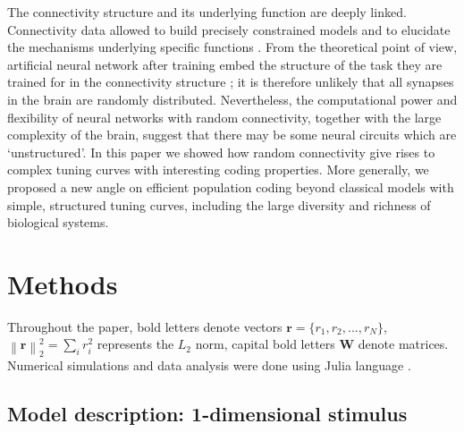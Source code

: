 \documentclass[a4paper]{article}
\begin{document}
The connectivity structure and its underlying function are deeply linked.  Connectivity data allowed  to build precisely constrained models \cite{Litwin-Kumar2019ConstrainingDiagrams} and to elucidate the mechanisms underlying specific functions \cite{Kim2014Space-timeRetina}. From the theoretical point of view,  artificial neural network after training embed the structure of the task they are trained for in the connectivity structure \cite{Farrell2020AutoencoderConnectomes}; it is therefore unlikely that all synapses in the brain are randomly distributed. Nevertheless, the computational power and flexibility of neural networks with random connectivity, together with the large complexity of the brain, suggest that there may be some neural circuits which are `unstructured'. In this paper we showed how random connectivity give rises to complex tuning curves with interesting coding properties. More generally, we proposed a new angle on efficient population coding beyond classical models with simple, structured tuning curves, including the large diversity and richness of biological systems.
\section{Methods}
\label{Se:Me}
Throughout the paper, bold letters denote vectors $\mathbf{r} = \{r_1,r_2,...,r_N \}$, $\left \lVert \mathbf{r} \right\rVert_2^2 = \sum_i r_i^2$ represents the $L_2$ norm, capital bold letters $\mathbf{W}$ denote matrices.
Numerical simulations and data analysis were done using Julia language \cite[]{Bezanson2017Julia:Computing}.
\subsection{Model description: 1-dimensional stimulus}
\end{document}
